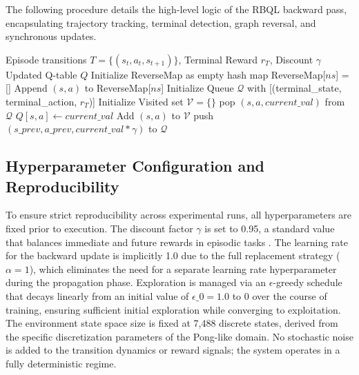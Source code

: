 \documentclass[manuscript, screen, review]{jair}
\begin{document}
The following procedure details the high-level logic of the RBQL backward pass, encapsulating trajectory tracking, terminal detection, graph reversal, and synchronous updates.

\begin{algorithm}[t]
\caption{Recursive Backwards Q-Learning (RBQL) Backward Pass}
\label{alg:rbql_backward}
\begin{algorithmic}[1]
\Require Episode transitions $T = \{(s_t, a_t, s_{t+1})\}$, Terminal Reward $r_T$, Discount $\gamma$
\Ensure Updated Q-table $Q$
\State Initialize ReverseMap as empty hash map
        \State ReverseMap[$ns$] = []
    \EndIf
    \State Append $(s, a)$ to ReverseMap[$ns$]
\EndFor
\State Initialize Queue $\mathcal{Q}$ with [(terminal\_state, terminal\_action, $r_T$)]
\State Initialize Visited set $\mathcal{V} = \{\}$
    \State pop $(s, a, current\_val)$ from $\mathcal{Q}$
        \State $Q[s, a] \leftarrow current\_val$ 
        \State Add $(s, a)$ to $\mathcal{V}$
                \State push $(s\_{prev}, a\_{prev}, current\_val * \gamma)$ to $\mathcal{Q}$
            \EndIf
        \EndFor
    \EndIf
\EndWhile
\end{algorithmic}
\end{algorithm}

\subsection{Hyperparameter Configuration and Reproducibility}

To ensure strict reproducibility across experimental runs, all hyperparameters are fixed prior to execution. The discount factor $\gamma$ is set to 0.95, a standard value that balances immediate and future rewards in episodic tasks \cite{Diekhoff2024RecursiveBQ}. The learning rate for the backward update is implicitly 1.0 due to the full replacement strategy ($\alpha=1$), which eliminates the need for a separate learning rate hyperparameter during the propagation phase. Exploration is managed via an $\epsilon$-greedy schedule that decays linearly from an initial value of $\epsilon\_0 = 1.0$ to 0 over the course of training, ensuring sufficient initial exploration while converging to exploitation. The environment state space size is fixed at 7,488 discrete states, derived from the specific discretization parameters of the Pong-like domain. No stochastic noise is added to the transition dynamics or reward signals; the system operates in a fully deterministic regime.
\end{document}
